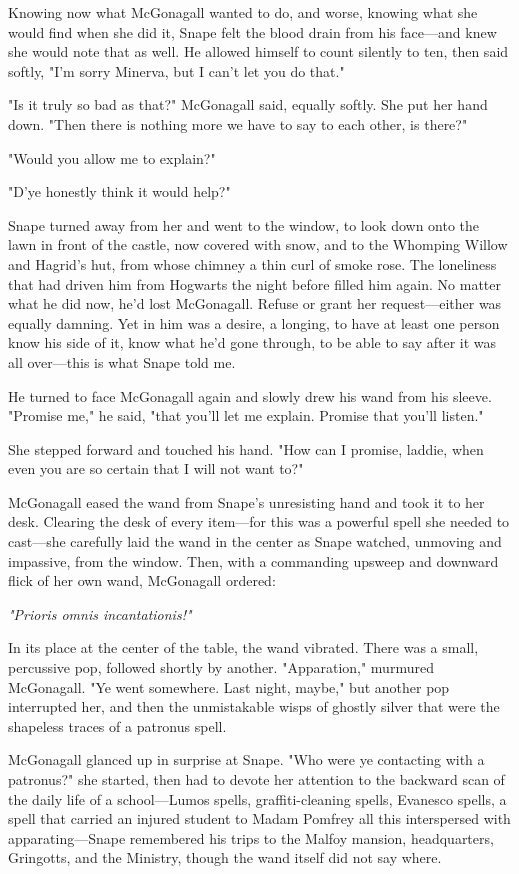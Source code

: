 Knowing now what McGonagall wanted to do, and worse, knowing what she would find when she did it, Snape felt the blood drain from his face—and knew she would note that as well. He allowed himself to count silently to ten, then said softly, "I'm sorry Minerva, but I can't let you do that."

"Is it truly so bad as that?" McGonagall said, equally softly. She put her hand down. "Then there is nothing more we have to say to each other, is there?"

"Would you allow me to explain?"

"D'ye honestly think it would help?"

Snape turned away from her and went to the window, to look down onto the lawn in front of the castle, now covered with snow, and to the Whomping Willow and Hagrid's hut, from whose chimney a thin curl of smoke rose. The loneliness that had driven him from Hogwarts the night before filled him again. No matter what he did now, he'd lost McGonagall. Refuse or grant her request—either was equally damning. Yet in him was a desire, a longing, to have at least one person know his side of it, know what he'd gone through, to be able to say after it was all over—this is what Snape told me.

He turned to face McGonagall again and slowly drew his wand from his sleeve. "Promise me," he said, "that you'll let me explain. Promise that you'll listen."

She stepped forward and touched his hand. "How can I promise, laddie, when even you are so certain that I will not want to?"

McGonagall eased the wand from Snape's unresisting hand and took it to her desk. Clearing the desk of every item—for this was a powerful spell she needed to cast—she carefully laid the wand in the center as Snape watched, unmoving and impassive, from the window. Then, with a commanding upsweep and downward flick of her own wand, McGonagall ordered:

\emph{"Prioris omnis incantationis!"}

In its place at the center of the table, the wand vibrated. There was a small, percussive pop, followed shortly by another. "Apparation," murmured McGonagall. "Ye went somewhere. Last night, maybe," but another pop interrupted her, and then the unmistakable wisps of ghostly silver that were the shapeless traces of a patronus spell.

McGonagall glanced up in surprise at Snape. "Who were ye contacting with a patronus?" she started, then had to devote her attention to the backward scan of the daily life of a school—Lumos spells, graffiti-cleaning spells, Evanesco spells, a spell that carried an injured student to Madam Pomfrey{\el} all this interspersed with apparating—Snape remembered his trips to the Malfoy mansion, headquarters, Gringotts, and the Ministry, though the wand itself did not say where.

